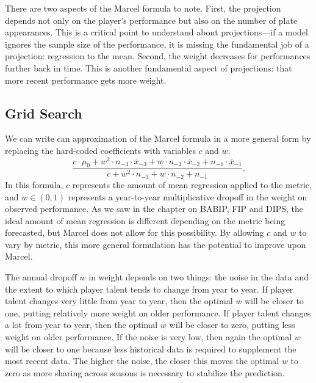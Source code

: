 \documentclass{article}
\begin{document}
    There are two aspects of the Marcel formula to note. First, the projection depends not only on the player's performance but also on the number of plate appearances. This is a critical point to understand about projections---if a model ignores the sample size of the performance, it is missing the fundamental job of a projection: regression to the mean. Second, the weight decreases for performances further back in time. This is another fundamental aspect of projections: that more recent performance gets more weight.

  \subsection{\sc Grid Search}

    We can write can approximation of the Marcel formula in a more general form by replacing the hard-coded coefficients with variables $c$ and $w$.
    \begin{equation}
      \label{eqn:grid-search}
      \frac
        {c \cdot \mu_0 + w^2 \cdot n_{-3} \cdot \bar x_{-3} + w \cdot n_{-2} \cdot \bar x_{-2} + n_{-1} \cdot \bar x_{-1}}
        {c + w^2 \cdot n_{-3} + w \cdot n_{-2} + n_{-1}}.
    \end{equation}
    In this formula, $c$ represents the amount of mean regression applied to the metric, and $w \in (0, 1)$ represents a year-to-year multiplicative dropoff in the weight on observed performance. As we saw in the chapter on BABIP, FIP and DIPS, the ideal amount of mean regression is different depending on the metric being forecasted, but Marcel does not allow for this possibility. By allowing $c$ and $w$ to vary by metric, this more general formulation has the potential to improve upon Marcel.

    The annual dropoff $w$ in weight depends on two things: the noise in the data and the extent to which player talent tends to change from year to year. If player talent changes very little from year to year, then the optimal $w$ will be closer to one, putting relatively more weight on older performance. If player talent changes a lot from year to year, then the optimal $w$ will be closer to zero, putting less weight on older performance. If the noise is very low, then again the optimal $w$ will be closer to one because less historical data is required to supplement the most recent data. The higher the noise, the closer this moves the optimal $w$ to zero as more sharing across seasons is necessary to stabilize the prediction.
\end{document}
